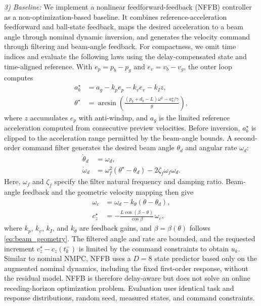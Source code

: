 \documentclass[letterpaper, 10 pt, conference]{ieeeconf}  %
\begin{document}
\textit{3) Baseline:}
We implement a nonlinear feedforward-feedback (NFFB) controller as a non-optimization-based baseline. It combines
reference-acceleration feedforward and ball-state feedback, maps the desired acceleration to a beam angle through
nominal dynamic inversion, and generates the velocity command through filtering and beam-angle feedback.
For compactness, we omit time indices and evaluate the following laws using the delay-compensated
state and time-aligned reference. With $e_p=p_b-p_g$ and $e_v=v_b-v_g$, the outer loop computes
\begin{equation}
\begin{aligned}
    a_b^\star
    &=a_g-k_p e_p-k_v e_v-k_I z,\\
    \theta^\star
    &=\arcsin\!\left(
    \frac{(p_b+d_b-L)\omega^2-a_b^\star/\gamma}{g}
    \right),
\end{aligned}
    \label{eq:nffb_outer_loop}
\end{equation}
where $z$ accumulates $e_p$ with anti-windup, and $a_g$ is the limited reference acceleration
computed from consecutive preview velocities. Before inversion, $a_b^\star$ is clipped to the
acceleration range permitted by the beam-angle bounds. A second-order command filter generates
the desired beam angle $\theta_d$ and angular rate $\omega_d$:
\begin{equation}
\begin{aligned}
    \dot{\theta}_d&=\omega_d,\\
    \dot{\omega}_d
    &=\omega_f^2(\theta^\star-\theta_d)
    -2\zeta_f\omega_f\omega_d.
\end{aligned}
    \label{eq:nffb_command_filter}
\end{equation}
Here, $\omega_f$ and $\zeta_f$ specify the filter natural frequency and damping ratio.
Beam-angle feedback and the geometric velocity mapping then give
\begin{equation}
\begin{aligned}
    \omega_c&=\omega_d-k_\theta(\theta-\theta_d),\\
    c_z^\star&=-\frac{L\cos(\beta-\theta)}{\cos\beta}\,\omega_c,
\end{aligned}
    \label{eq:nffb_inner_loop}
\end{equation}
where $k_p$, $k_v$, $k_I$, and $k_\theta$ are feedback gains, and $\beta=\beta(\theta)$
follows \eqref{eq:beam_geometry}. The filtered angle and rate are bounded, and the requested
increment $c_z^\star-c_z(t_k^-)$ is limited by the command constraints to obtain $u_k$.
Similar to nominal NMPC, NFFB uses a $D=8$ state predictor based only on the augmented nominal dynamics, including the
fixed first-order response, without the residual model. NFFB is therefore delay-aware but does not solve an
online receding-horizon optimization problem. Evaluation uses identical task and response
distributions, random seed, measured states, and command constraints.
\end{document}
